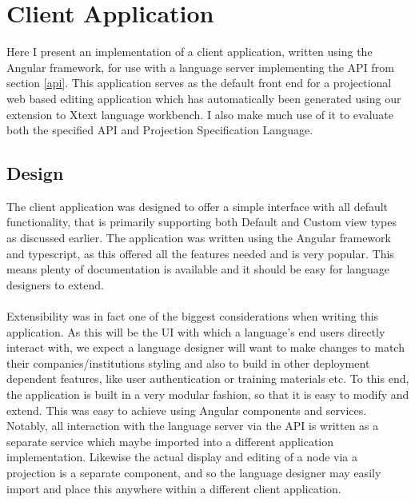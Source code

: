 \documentclass{article}
\begin{document}
\section{Client Application}\label{clientApp}
Here I present an implementation of a client application, written using the Angular framework, for use with a language server implementing the API from section \ref{api}. This application serves as the default front end for a projectional web based editing application which has automatically been generated using our extension to Xtext language workbench. I also make much use of it to evaluate both the specified API and Projection Specification Language. 

\subsection{Design}
The client application was designed to offer a simple interface with all default functionality, that is primarily  supporting both Default and Custom view types as discussed earlier. The application was written using the Angular framework and typescript, as this offered all the features needed and is very popular. This means plenty of documentation is available and it should be easy for language designers to extend.
\\
\\
Extensibility was in fact one of the biggest considerations when writing this application. As this will be the UI with which a language's end users directly interact with, we expect a language designer will want to make changes to match their companies/institutions styling and also to build in other  deployment dependent features, like user authentication or training materials etc. To this end, the application is built in a very modular fashion, so that it is easy to modify and extend. This was easy to achieve using Angular components and services. Notably, all interaction with the language server via the API is written as a separate service which maybe imported into a different application implementation. Likewise the actual display and editing of a node via a projection is a separate component, and so the language designer may easily import and place this anywhere within a different client application.
\end{document}
